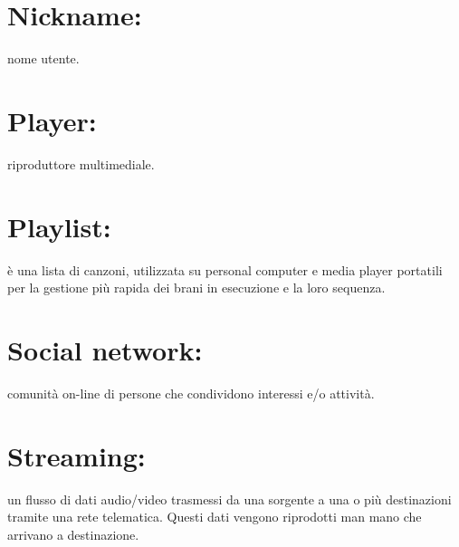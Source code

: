 \section*{Nickname:} nome utente.
\section*{Player:} riproduttore multimediale.
\section*{Playlist:} \`e una lista di canzoni, utilizzata su
personal computer e media player portatili per la gestione pi\`u rapida dei
brani in esecuzione e la loro sequenza.
\section*{Social network:} comunit\`a on-line di persone che condividono
interessi e/o attivit\`a.
\section*{Streaming:} un flusso di dati audio/video trasmessi da una sorgente
a una o pi\`u destinazioni tramite una rete telematica. Questi dati vengono
riprodotti man mano che arrivano a destinazione.


